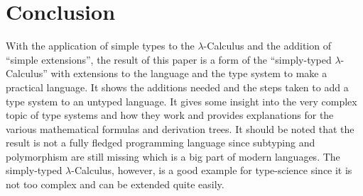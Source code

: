 \section{Conclusion}

With the application of simple types to the $\lambda$-Calculus
and the addition of ``simple extensions'', the result of this paper
is a form of the ``simply-typed $\lambda$-Calculus'' with extensions to
the language and the type system to make a practical language. It shows
the additions needed and the steps taken to add a type system to an
untyped language. It gives some insight into the very complex topic
of type systems and how they work and provides explanations for the
various mathematical formulas and derivation trees. It should be
noted that the result is not a fully fledged programming language since
subtyping and polymorphism are still missing which is a big part of
modern languages. The simply-typed $\lambda$-Calculus, however, is
a good example for type-science since it is not too complex and
can be extended quite easily.
